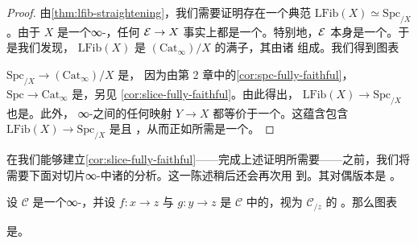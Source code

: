 \begin{proof}
由\cref{thm:lfib-straightening}，我们需要证明存在一个典范\trEquivalence{}%
$\mathrm{LFib}(X) \simeq \mathrm{Spc}_{/X}$。由于 $X$ 是一个∞-\trGroupoid{}，任何%
\trLeftFibration{} $\mathcal{E} \to X$ 事实上都是一个\trKanFibration{}。特别地，$\mathcal{E}$
本身是一个\trKanComplex{}。于是我们发现，\trCategory{} $\mathrm{LFib}(X)$ 是%
\trSlice{} $(\mathrm{Cat}_\infty)/X$ 的满子\trCategory{}，其\trObject{}由诸%
\trKanFibration{}组成。我们得到图表
\begin{center}
\end{center}
\trFunctor{} $\mathrm{Spc}_{/X} \to (\mathrm{Cat}_\infty)/X$ 是\trFullyFaithful{}，
因为由第 2 章中的\cref{cor:spc-fully-faithful}，\trFunctor{}%
$\mathrm{Spc} \to \mathrm{Cat}_\infty$ 是\trFullyFaithful{}，另见%
\cref{cor:slice-fully-faithful}。由此得出，\trFunctor{}%
$\mathrm{LFib}(X) \to \mathrm{Spc}_{/X}$ 也是\trFullyFaithful{}。此外，
∞-\trGroupoid{}之间的任何映射 $Y \to X$ 都等价于一个\trKanFibration{}。这蕴含包含
$\mathrm{LFib}(X) \to \mathrm{Spc}_{/X}$ 是\trEssentiallySurjective{}且%
\trFullyFaithful{}，从而正如所需是一个\trEquivalence{}。
\end{proof}

在我们能够建立\cref{cor:slice-fully-faithful}——完成上述证明所需要——之前，我们将
需要下面对切片∞-\trCategories{}中诸\trMappingSpace{}的分析。这一陈述稍后还会再次用
到。其对偶版本是 \cite[Lemma 5.5.5.12]{Lur09}。

\begin{proposition}\label{prop:mapping-space-slice}
设 $\mathcal{C}$ 是一个∞-\trCategory{}，并设 $f\colon x \to z$ 与
$g\colon y \to z$ 是 $\mathcal{C}$ 中的\trMorphism{}，视为 $\mathcal{C}_{/z}$ 的%
\trObject{}。那么图表
\begin{center}
\end{center}
是\trHomotopyCartesian{}。
\end{proposition}


